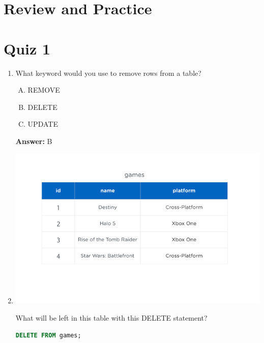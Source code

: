 \documentclass[12pt]{article}
\begin{document}
\bigskip

\section{Review and Practice}

\bigskip

\section{Quiz 1}

\bigskip

\begin{enumerate}[1.]
    \item

    What keyword would you use to remove rows from a table?

    \bigskip

    \begin{enumerate}[A.]
        \item REMOVE
        \item DELETE
        \item UPDATE
    \end{enumerate}

    \bigskip

    \textbf{Answer:} B

    \item

    \begin{center}
    \includegraphics[width=0.8 \linewidth]{images/part_3_notes_1.png}
    \end{center}

    \bigskip

    What will be left in this table with this DELETE statement?

    \bigskip

    \begin{lstlisting}[language=SQL]
    DELETE FROM games;
    \end{lstlisting}


\end{enumerate}
\end{document}
